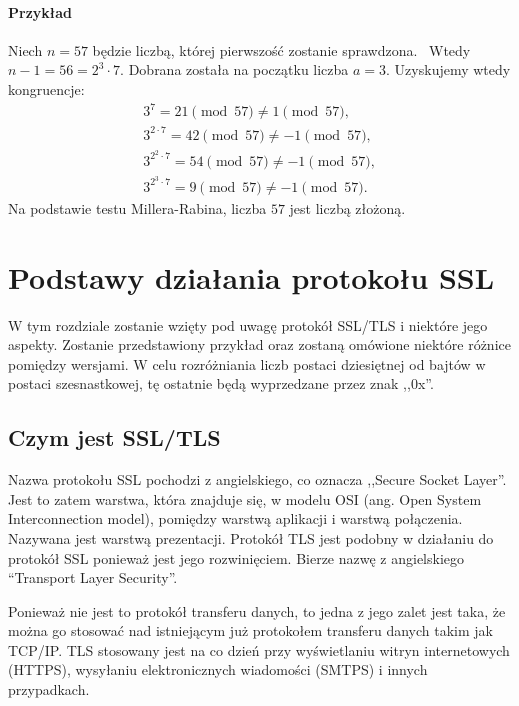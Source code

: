 \documentclass[12pt,twoside,a4]{mwbk}
\theoremstyle{definition}
\begin{document}
\subsubsection{Przykład}
Niech $n = 57$ będzie liczbą, której pierwszość zostanie sprawdzona. ~Wtedy $n-1= 56 = 2^3 \cdot 7$. Dobrana została na początku liczba $a = 3$. Uzyskujemy wtedy kongruencje:
\[ \begin{array}{c}
3^{7} = 21 \pmod{57} \neq 1 \pmod{57}, \\
3^{2 \cdot 7} = 42 \pmod{57} \neq -1 \pmod{57}, \\
3^{2^2 \cdot 7} = 54 \pmod{57} \neq -1 \pmod{57}, \\
3^{2^3 \cdot 7} = 9 \pmod{57} \neq -1 \pmod{57}.
\end{array} \]
Na podstawie testu Millera-Rabina, liczba $57$ jest liczbą złożoną.




\chapter{Podstawy działania protokołu SSL}
W tym rozdziale zostanie wzięty pod uwagę protokół SSL/TLS i niektóre jego aspekty. Zostanie przedstawiony przykład oraz zostaną omówione niektóre różnice pomiędzy wersjami. W celu rozróżniania liczb postaci dziesiętnej od bajtów w postaci szesnastkowej, tę ostatnie będą wyprzedzane przez znak ,,0x''.


\section{Czym jest SSL/TLS}
Nazwa protokołu SSL pochodzi z angielskiego, co oznacza ,,Secure Socket Layer''. Jest to zatem warstwa, która znajduje się, w modelu OSI (ang. Open System Interconnection model), pomiędzy warstwą aplikacji i warstwą połączenia. Nazywana jest warstwą prezentacji. Protokół TLS jest podobny w działaniu do protokół SSL ponieważ jest jego rozwinięciem. Bierze nazwę z angielskiego ``Transport Layer Security''. \\ \par

Ponieważ nie jest to protokół transferu danych, to jedna z jego zalet jest taka, że można go stosować nad istniejącym już protokołem transferu danych takim jak TCP/IP. TLS stosowany jest na co dzień przy wyświetlaniu witryn internetowych (HTTPS), wysyłaniu elektronicznych wiadomości (SMTPS) i innych przypadkach.  \\ \par
\end{document}
